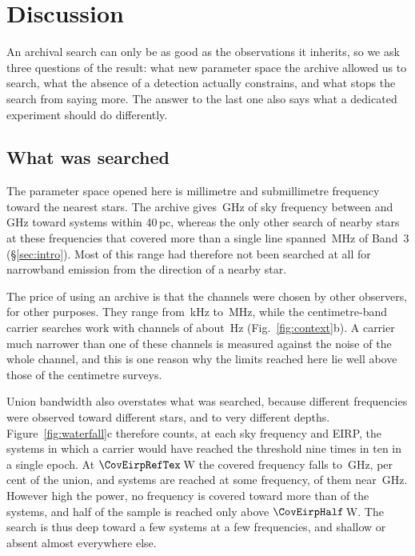 \section{Discussion}
\label{sec:discussion}

An archival search can only be as good as the observations it inherits, so
we ask three questions of the result: what new parameter space
the archive allowed us to search, what the absence of a detection actually
constrains, and what stops the search from saying more. The answer to the
last one also says what a dedicated experiment should do differently.

\subsection{What was searched}
\label{sec:newspace}

The parameter space opened here is millimetre and submillimetre frequency
toward the nearest stars. The archive gives \CvUnionA\,GHz of sky frequency
between \SurvFreqLoA{} and \SurvFreqHiA\,GHz toward systems within 40\,pc,
whereas the only other search of nearby stars at these frequencies that
covered more than a single line spanned \MasonBandMHz\,MHz of Band~3
(\S\ref{sec:intro}). Most of this range had therefore not been searched at
all for narrowband emission from the direction of a nearby star.

The price of using an archive is that the channels were chosen by other
observers, for other purposes. They range from \SzChanFinestKHz\,kHz to
\SzChanWidestMHz\,MHz, while the centimetre-band carrier searches work with
channels of about \SzChanLitHz\,Hz (Fig.~\ref{fig:context}b). A carrier much
narrower than one of these channels is measured against the noise of the
whole channel, and this is one reason why the limits reached here lie well
above those of the centimetre surveys.

Union bandwidth also overstates what was searched, because different
frequencies were observed toward different stars, and to very different
depths. Figure~\ref{fig:waterfall}c therefore counts, at each sky frequency
and EIRP, the systems in which a carrier would have reached the threshold
nine times in ten in a single epoch. At $\CovEirpRefTex$\,W the covered frequency falls to
\CovUnionAtRef\,GHz, \CovFracAtRef{} per cent of the union, and
\CovNSysAtRef{} systems are reached at some frequency, \CovNMaxAtRef{} of them
near \CovNuMaxAtRef\,GHz. However high the power, no frequency is covered
toward more than \CovNMaxFull{} of the \NSysClassA{} systems, and half of the
sample is
reached only above $\CovEirpHalf$\,W. The search is thus deep toward a few
systems at a few frequencies, and shallow or absent almost everywhere else.


